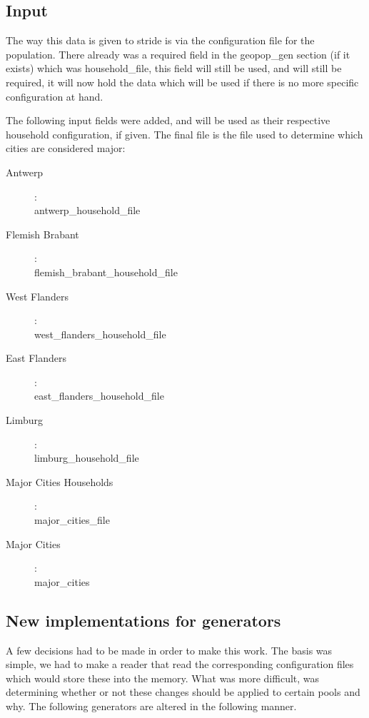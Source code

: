 \subsection{Input}
The way this data is given to stride is via the configuration file for the population. There already was a required field in the geopop\_gen section (if it exists) which was household\_file, this field will still be used, and will still be required, it will now hold the data which will be used if there is no more specific configuration at hand.

The following input fields were added, and will be used as their respective household configuration, if given. The final file is the file used to determine which cities are considered major:

\begin{description}
	\item[Antwerp]: \\ 
		antwerp\_household\_file 
	\item[Flemish Brabant]: \\
		flemish\_brabant\_household\_file
	\item[West Flanders]: \\
		west\_flanders\_household\_file
	\item[East Flanders]: \\
		east\_flanders\_household\_file
	\item[Limburg]: \\
		limburg\_household\_file
	\item[Major Cities Households]: \\
		major\_cities\_file 
	\item[Major Cities]: \\
		major\_cities
\end{description}

\subsection{New implementations for generators}
A few decisions had to be made in order to make this work. The basis was simple, we had to make a reader that read the corresponding configuration files which would store these into the memory. What was more difficult, was determining whether or not these changes should be applied to certain pools and why. The following generators are altered in the following manner.

